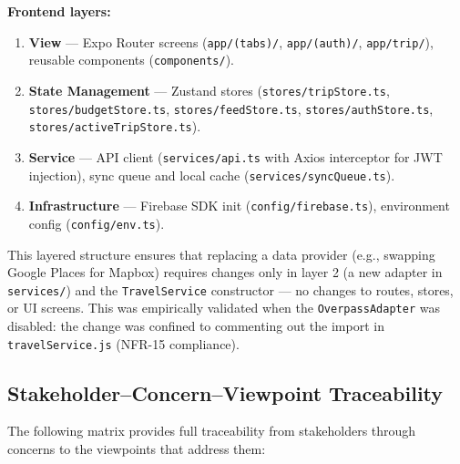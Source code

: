 \documentclass[12pt, a4paper]{article}
\newcommand{\code}[1]{\texttt{\small #1}}
\begin{document}
\textbf{Frontend layers:}
\begin{enumerate}
  \item \textbf{View} --- Expo Router screens (\code{app/(tabs)/}, \code{app/(auth)/}, \code{app/trip/}), reusable components (\code{components/}).
  \item \textbf{State Management} --- Zustand stores (\code{stores/tripStore.ts}, \code{stores/budgetStore.ts}, \code{stores/feedStore.ts}, \code{stores/authStore.ts}, \code{stores/activeTripStore.ts}).
  \item \textbf{Service} --- API client (\code{services/api.ts} with Axios interceptor for JWT injection), sync queue and local cache (\code{services/syncQueue.ts}).
  \item \textbf{Infrastructure} --- Firebase SDK init (\code{config/firebase.ts}), environment config (\code{config/env.ts}).
\end{enumerate}

This layered structure ensures that replacing a data provider (e.g., swapping Google Places for Mapbox) requires changes only in layer 2 (a new adapter in \code{services/}) and the \code{TravelService} constructor --- no changes to routes, stores, or UI screens. This was empirically validated when the \code{OverpassAdapter} was disabled: the change was confined to commenting out the import in \code{travelService.js} (NFR-15 compliance).

\subsection{Stakeholder--Concern--Viewpoint Traceability}

The following matrix provides full traceability from stakeholders through concerns to the viewpoints that address them:
\end{document}

